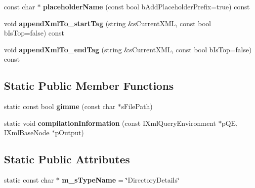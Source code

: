 \begin{DoxyCompactItemize}
\item 
\hypertarget{classgeneral__server_1_1DirectoryDetails_a5c7df91be3f7e5bddda3179cba588ac9}{const char $\ast$ {\bfseries placeholder\-Name} (const bool b\-Add\-Placeholder\-Prefix=true) const }\label{classgeneral__server_1_1DirectoryDetails_a5c7df91be3f7e5bddda3179cba588ac9}

\item 
\hypertarget{classgeneral__server_1_1DirectoryDetails_a28d30f1eac25b6e5a337df03d1921804}{void {\bfseries append\-Xml\-To\-\_\-start\-Tag} (string \&s\-Current\-X\-M\-L, const bool b\-Is\-Top=false) const }\label{classgeneral__server_1_1DirectoryDetails_a28d30f1eac25b6e5a337df03d1921804}

\item 
\hypertarget{classgeneral__server_1_1DirectoryDetails_ab7f8dbbea2950ec826269b5b04d2645a}{void {\bfseries append\-Xml\-To\-\_\-end\-Tag} (string \&s\-Current\-X\-M\-L, const bool b\-Is\-Top=false) const }\label{classgeneral__server_1_1DirectoryDetails_ab7f8dbbea2950ec826269b5b04d2645a}

\end{DoxyCompactItemize}
\subsection*{\-Static \-Public \-Member \-Functions}
\begin{DoxyCompactItemize}
\item 
\hypertarget{classgeneral__server_1_1DirectoryDetails_a05ee9d41e7991922af2380b7689cecb4}{static const bool {\bfseries gimme} (const char $\ast$s\-File\-Path)}\label{classgeneral__server_1_1DirectoryDetails_a05ee9d41e7991922af2380b7689cecb4}

\item 
\hypertarget{classgeneral__server_1_1DirectoryDetails_a1698a5bf91bbde637fcb934b16156632}{static void {\bfseries compilation\-Information} (const \-I\-Xml\-Query\-Environment $\ast$p\-Q\-E, \-I\-Xml\-Base\-Node $\ast$p\-Output)}\label{classgeneral__server_1_1DirectoryDetails_a1698a5bf91bbde637fcb934b16156632}

\end{DoxyCompactItemize}
\subsection*{\-Static \-Public \-Attributes}
\begin{DoxyCompactItemize}
\item 
\hypertarget{classgeneral__server_1_1DirectoryDetails_a8550b451708832735719c1ca87192f60}{static const char $\ast$ {\bfseries m\-\_\-s\-Type\-Name} = \char`\"{}\-Directory\-Details\char`\"{}}\label{classgeneral__server_1_1DirectoryDetails_a8550b451708832735719c1ca87192f60}

\end{DoxyCompactItemize}
